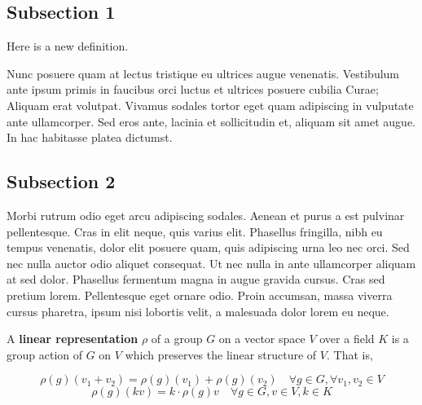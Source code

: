 \subsection{Subsection 1}

\begin{defn}Here is a new definition.\end{defn}

Nunc posuere quam at lectus tristique eu ultrices augue venenatis. Vestibulum ante ipsum primis in faucibus orci luctus et ultrices posuere cubilia Curae; Aliquam erat volutpat. Vivamus sodales tortor eget quam adipiscing in vulputate ante ullamcorper. Sed eros ante, lacinia et sollicitudin et, aliquam sit amet augue. In hac habitasse platea dictumst.


\subsection{Subsection 2}
Morbi rutrum odio eget arcu adipiscing sodales. Aenean et purus a est pulvinar pellentesque. Cras in elit neque, quis varius elit. Phasellus fringilla, nibh eu tempus venenatis, dolor elit posuere quam, quis adipiscing urna leo nec orci. Sed nec nulla auctor odio aliquet consequat. Ut nec nulla in ante ullamcorper aliquam at sed dolor. Phasellus fermentum magna in augue gravida cursus. Cras sed pretium lorem. Pellentesque eget ornare odio. Proin accumsan, massa viverra cursus pharetra, ipsum nisi lobortis velit, a malesuada dolor lorem eu neque.


\begin{defn}A \textbf{linear representation} $\rho$ of a group $G$ on a vector space $V$ over a field $K$ is a group action of $G$ on $V$ which preserves the linear structure of $V$.  That is, 


\begin{equation} \rho(g)(v_1+v_2)=\rho(g)(v_1)+\rho(g)(v_2) \quad  \forall g \in G, \forall v_1, v_2 \in V \end{equation}
 \[\rho(g)(kv) = k \cdot \rho(g)v \quad \forall g \in G, v \in V, k \in K \]

 \end{defn}

